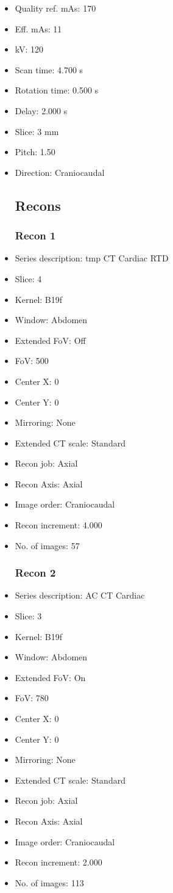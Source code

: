 \documentclass[12pt]{article}
\begin{document}
\begin{itemize}
\subsection{Scan}
\item Quality ref. mAs: 170\item Eff. mAs: 11\item kV: 120\item Scan time: 4.700 s\item Rotation time: 0.500 s\item Delay: 2.000 s\item Slice: 3 mm\item Pitch: 1.50\item Direction: Craniocaudal\subsection{Recons}

\subsubsection{Recon 1}
\item Series description: tmp CT Cardiac RTD
\item Slice: 4
\item Kernel: B19f
\item Window: Abdomen
\item Extended FoV: Off
\item FoV: 500
\item Center X: 0
\item Center Y: 0
\item Mirroring: None
\item Extended CT scale: Standard
\item Recon job: Axial
\item Recon Axis: Axial
\item Image order: Craniocaudal
\item Recon increment: 4.000
\item No. of images: 57
\subsubsection{Recon 2}
\item Series description: AC CT Cardiac
\item Slice: 3
\item Kernel: B19f
\item Window: Abdomen
\item Extended FoV: On
\item FoV: 780
\item Center X: 0
\item Center Y: 0
\item Mirroring: None
\item Extended CT scale: Standard
\item Recon job: Axial
\item Recon Axis: Axial
\item Image order: Craniocaudal
\item Recon increment: 2.000
\item No. of images: 113

\end{itemize}
\end{document}

